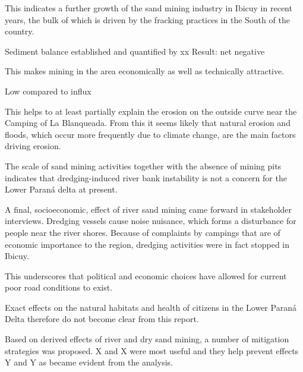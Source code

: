 This indicates a further growth of the sand mining industry in Ibicuy in recent years, the bulk of which is driven by the fracking practices in the South of the country.

Sediment balance established and quantified by xx
Result: net negative

This makes mining in the area economically as well as technically attractive.


Low compared to influx







This helps to at least partially explain the erosion on the outside curve near the Camping of La Blanqueada. From this it seems likely that natural erosion and floods, which occur more frequently due to climate change, are the main factors driving erosion.

The scale of sand mining activities together with the absence of mining pits indicates that dredging-induced river bank instability is not a concern for the Lower Paraná delta at present.

 A final, socioeconomic, effect of river sand mining came forward in stakeholder interviews. Dredging vessels cause noise nuisance, which forms a disturbance for people near the river shores. Because of complaints by campings that are of economic importance to the region, dredging activities were in fact stopped in Ibicuy.


This underscores that political and economic choices have allowed for current poor road conditions to exist.

Exact effects on the natural habitats and health of citizens in the Lower Paraná Delta therefore do not become clear from this report.

Based on derived effects of river and dry sand mining, a number of mitigation strategies was proposed. X and X were most useful and they help prevent effects Y and Y as became evident from the analysis.

